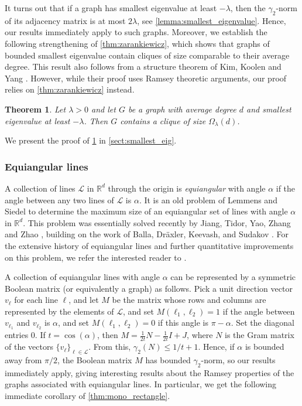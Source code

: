 \documentclass[11pt]{amsart}
\theoremstyle{plain}
\newtheorem{theorem}{Theorem}[section]
\theoremstyle{definition}
\begin{document}
It turns out that if a graph has smallest eigenvalue at least $-\lambda$, then the $\gamma_2$-norm of its adjacency matrix is at most $2\lambda$, see  \cref{lemma:smallest_eigenvalue}. Hence, our results immediately apply to such graphs. Moreover, we establish the following strengthening of  \cref{thm:zarankiewicz}, which shows that graphs of bounded smallest eigenvalue contain cliques of size comparable to their average degree. This result also follows from a structure theorem of Kim, Koolen and Yang \cite{KKY}. However, while their proof uses Ramsey theoretic arguments, our proof relies on \cref{thm:zarankiewicz} instead.

\begin{theorem}\label{thm:smallest_eigenval}
Let $\lambda>0$ and let $G$ be a graph with average degree $d$ and smallest eigenvalue at least $-\lambda$. Then $G$ contains a clique of size $\Omega_{\lambda}(d)$.
\end{theorem}

We present the proof of \cref{thm:smallest_eigenval} in \cref{sect:smallest_eig}.


\subsubsection{Equiangular lines} A collection of lines $\mathcal{L}$ in $\mathbb{R}^d$ through the origin is \emph{equiangular} with angle $\alpha$ if the angle between any two lines of $\mathcal{L}$ is $\alpha$. It is an old problem of Lemmens and Siedel \cite{LemmensSiedel} to determine the maximum  size of an equiangular set of lines with angle $\alpha$ in $\mathbb{R}^d$. This problem was essentially solved recently by Jiang, Tidor, Yao, Zhang and Zhao \cite{JTYZZ}, building on the work of  Balla,  Dr\"axler, Keevash, and Sudakov \cite{BDKS}. For the extensive history of equiangular lines and further quantitative improvements on this problem, we refer the interested reader to \cite{Balla}.

A collection of equiangular lines with angle $\alpha$ can be represented by a symmetric Boolean matrix (or equivalently a graph) as follows. Pick a unit direction vector $v_{\ell}$ for each line $\ell$, and let $M$ be the matrix whose rows and columns are represented by the elements of $\mathcal{L}$, and set $M(\ell_1,\ell_2)=1$ if the angle between $v_{\ell_1}$ and $v_{\ell_2}$ is $\alpha$, and set $M(\ell_1,\ell_2)=0$ if this angle is $\pi-\alpha$. Set the diagonal entries 0. If $t=\cos(\alpha)$, then $M=\frac{1}{2t}N-\frac{1}{2t}I+J$, where $N$ is the Gram matrix of the vectors $\{v_{\ell}\}_{\ell\in \mathcal{L}}$. From this, $\gamma_2(N)\leq 1/t+1$. Hence, if $\alpha$ is bounded away from $\pi/2$, the Boolean matrix $M$ has bounded $\gamma_2$-norm, so our results immediately apply, giving interesting results about the Ramsey properties of the graphs associated with equiangular lines. In particular, we get the following immediate corollary of \cref{thm:mono_rectangle}.
\end{document}
